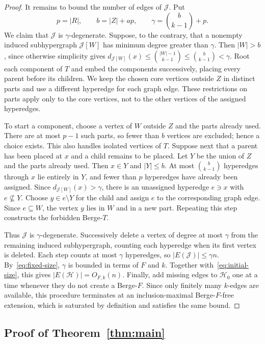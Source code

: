 \documentclass[10pt,a4paper]{article}
\numberwithin{equation}{section}
\theoremstyle{definition}
\theoremstyle{plain}
\newcommand{\HH}{\mathcal H}
\newcommand{\JJ}{\mathcal J}
\begin{document}
\begin{proof}
It remains to bound the number of edges of $\JJ$. Put
\[
 p=|R|,\qquad b=|Z|+ap,\qquad
 \gamma=\binom b{k-1}+p.
\]
We claim that $\JJ$ is $\gamma$-degenerate. Suppose, to the contrary,
that a nonempty induced subhypergraph $\JJ[W]$ has minimum degree
greater than $\gamma$. Then $|W|>b$, since otherwise simplicity gives
$d_{\JJ[W]}(x)\le\binom{|W|-1}{k-1}\le\binom b{k-1}<\gamma$.
Root each component of $T$ and embed the components successively,
placing every parent before its children. We keep the chosen core
vertices outside $Z$ in distinct parts and use a different hyperedge
for each graph edge. These restrictions on parts apply only to the
core vertices, not to the other vertices of the assigned hyperedges.

To start a component, choose a vertex of $W$ outside $Z$ and the
parts already used. There are at most $p-1$ such parts, so fewer
than $b$ vertices are excluded; hence a choice exists. This also
handles isolated vertices of $T$.
Suppose next that a parent has been placed at $x$ and a child remains
to be placed. Let $Y$ be the union of $Z$ and the parts already used.
Then $x\in Y$ and $|Y|\le b$. At most $\binom b{k-1}$ hyperedges
through $x$ lie entirely in $Y$, and fewer than $p$ hyperedges have
already been assigned. Since $d_{\JJ[W]}(x)>\gamma$, there is an
unassigned hyperedge $e\ni x$ with $e\nsubseteq Y$. Choose
$y\in e\setminus Y$ for the child and assign $e$ to the corresponding
graph edge. Since $e\subseteq W$, the vertex $y$ lies in $W$ and in
a new part. Repeating this step constructs the forbidden Berge-$T$.

Thus $\JJ$ is $\gamma$-degenerate. Successively delete a vertex of
degree at most $\gamma$ from the remaining induced subhypergraph,
counting each hyperedge when its first vertex is deleted.
Each step counts at most $\gamma$ hyperedges, so $|E(\JJ)|\le\gamma n$.
By~\eqref{eq:fixed-size}, $\gamma$ is bounded
in terms of $F$ and $k$. Together with~\eqref{eq:initial-size}, this
gives $|E(\HH)|=O_{F,k}(n)$. Finally, add missing edges to $\HH_0$
one at a time whenever they do not create a Berge-$F$. Since only
finitely many $k$-edges are available, this procedure terminates at
an inclusion-maximal Berge-$F$-free extension, which is saturated
by definition and satisfies the same bound.
\end{proof}


\FloatBarrier
\subsection{Proof of Theorem~\ref{thm:main}}
\end{document}
